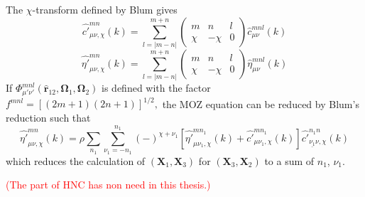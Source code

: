 The $\chi$-transform defined by Blum gives
\begin{equation}
\hat{c'}_{\mu\nu,\chi}^{mn}(k)=\sum_{l=\left|m-n\right|}^{m+n}\left(\begin{array}{ccc}
m & n & l\\
\chi & -\chi & 0
\end{array}\right)\hat{c}_{\mu\nu}^{mnl}(k)
\end{equation}
\begin{equation}
\hat{\eta'}_{\mu\nu,\chi}^{mn}(k)=\sum_{l=\left|m-n\right|}^{m+n}\left(\begin{array}{ccc}
m & n & l\\
\chi & -\chi & 0
\end{array}\right)\hat{\eta}_{\mu\nu}^{mnl}(k)
\end{equation}
If $\Phi_{\mu'\nu'}^{mnl}(\hat{\mathbf{r}}_{12},\mathbf{\Omega}_{1},\mathbf{\Omega}_{2})$
is defined with the factor $f^{mnl}=\left[(2m+1)(2n+1)\right]^{1/2},$
the \acs{MOZ} equation can be reduced by Blum's reduction such that
\begin{equation}
\hat{\eta'}_{\mu\nu,\chi}^{mn}(k)=\rho\sum_{n_{1}}\sum_{\nu_{1}=-n_{1}}^{n_{1}}(-)^{\chi+\nu_{1}}\left[\hat{\eta'}_{\mu\nu_{1},\chi}^{mn_{1}}(k)+\hat{c'}_{\mu\nu_{1},\chi}^{mn_{1}}(k)\right]\hat{c'}_{\underline{\nu_{1}}\nu,\chi}^{n_{1}n}(k)
\end{equation}
which reduces the calculation of $(\mathbf{X}_{1},\mathbf{X}_{3})$
for $(\mathbf{X}_{3},\mathbf{X}_{2})$ to a sum of $n_{1}$, $\nu_{1}$.

\textcolor{red}{(The part of HNC has non need in this thesis.)}
